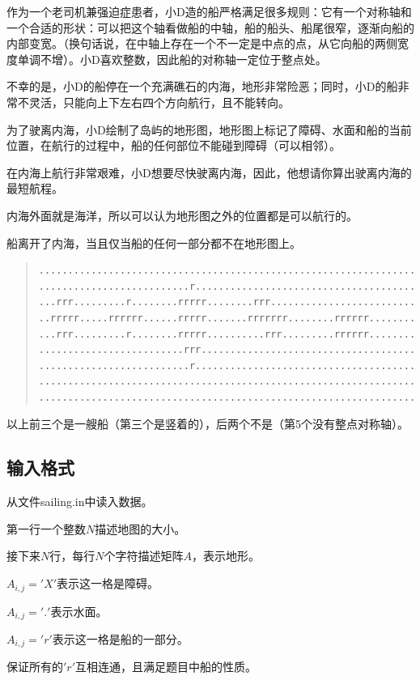 \documentclass[12pt, a4paper]{article}
\begin{document}
	作为一个老司机兼强迫症患者，小D造的船严格满足很多规则：它有一个对称轴和一个合适的形状：可以把这个轴看做船的中轴，船的船头、船尾很窄，逐渐向船的内部变宽。（换句话说，在中轴上存在一个不一定是中点的点，从它向船的两侧宽度单调不增）。小D喜欢整数，因此船的对称轴一定位于整点处。

	不幸的是，小D的船停在一个充满礁石的内海，地形非常险恶；同时，小D的船非常不灵活，只能向上下左右四个方向航行，且不能转向。

	为了驶离内海，小D绘制了岛屿的地形图，地形图上标记了障碍、水面和船的当前位置，在航行的过程中，船的任何部位不能碰到障碍（可以相邻）。

	在内海上航行非常艰难，小D想要尽快驶离内海，因此，他想请你算出驶离内海的最短航程。

	内海外面就是海洋，所以可以认为地形图之外的位置都是可以航行的。

	船离开了内海，当且仅当船的任何一部分都不在地形图上。

\begin{quote}
\begin{verbatim}
..................................................................
..........................r.......................................
...rrr.........r........rrrrr........rrr..........................
..rrrrr.....rrrrrr......rrrrr.......rrrrrrr........rrrrrr.........
...rrr.........r........rrrrr..........rrr.........rrrrrr.........
.........................rrr......................................
..........................r.......................................
..................................................................
..................................................................
\end{verbatim}
\end{quote}
以上前三个是一艘船（第三个是竖着的），后两个不是（第5个没有整点对称轴）。

\subsection{输入格式}

	从文件sailing.in中读入数据。

	第一行一个整数$N$描述地图的大小。

	接下来$N$行，每行$N$个字符描述矩阵$A$，表示地形。
	
	$A_{i,j}='X'$表示这一格是障碍。

	$A_{i,j}='.'$表示水面。

	$A_{i,j}='r'$表示这一格是船的一部分。

	保证所有的$'r'$互相连通，且满足题目中船的性质。
\end{document}
